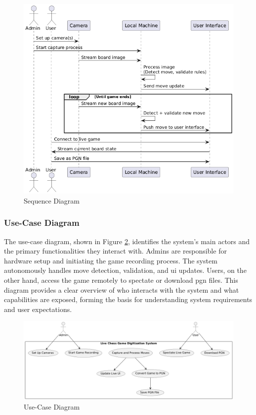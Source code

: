 \begin{figure}[h!]
    \centering
    \includegraphics[width=0.75\linewidth]{figures/methods/uml/sequence.png}
    \caption[Sequence Diagram]{Sequence Diagram}
    \label{fig:sequence}
\end{figure}

\subsubsection*{Use-Case Diagram}
\label{subsubsec:use-case-diagram}

The use-case diagram, shown in Figure \ref{fig:use-case}, identifies the system’s main actors and the primary functionalities they interact with. Admins are responsible for hardware setup and initiating the game recording process. The system autonomously handles move detection, validation, and \gls{ui} updates. Users, on the other hand, access the game remotely to spectate or download \gls{pgn} files. This diagram provides a clear overview of who interacts with the system and what capabilities are exposed, forming the basis for understanding system requirements and user expectations.

\begin{figure}[h!]
    \centering
    \includegraphics[width=0.75\linewidth]{figures/methods/uml/use-case.png}
    \caption{Use-Case Diagram}
    \label{fig:use-case}
\end{figure}

